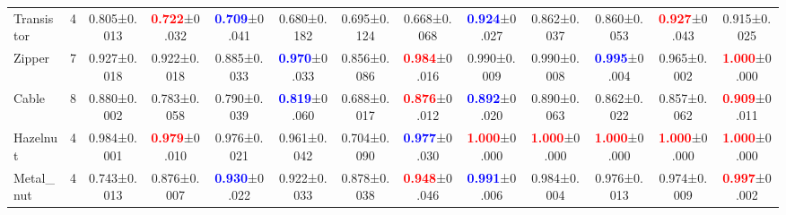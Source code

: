 \documentclass[10pt,twocolumn,letterpaper]{article}
\begin{document}
\begin{table*}[bt]
{\begin{tabular}{l@{}|c ||c||ccccc||ccccc}
    Transistor & 4& 0.805\footnotesize{±0.013}& \textcolor{red}{\textbf{0.722}}\footnotesize{±0.032}& \textcolor{blue}{\textbf{0.709}}\footnotesize{±0.041}& 0.680\footnotesize{±0.182}& 0.695\footnotesize{±0.124}& 0.668\footnotesize{±0.068}& \textcolor{blue}{\textbf{0.924}}\footnotesize{±0.027}& 0.862\footnotesize{±0.037}& 0.860\footnotesize{±0.053}& \textcolor{red}{\textbf{0.927}}\footnotesize{±0.043}& 0.915\footnotesize{±0.025} \\
    
    Zipper & 7& 0.927\footnotesize{±0.018}& 0.922\footnotesize{±0.018}& 0.885\footnotesize{±0.033}& \textcolor{blue}{\textbf{0.970}}\footnotesize{±0.033}& 0.856\footnotesize{±0.086}& \textcolor{red}{\textbf{0.984}}\footnotesize{±0.016}& 0.990\footnotesize{±0.009}& 0.990\footnotesize{±0.008}& \textcolor{blue}{\textbf{0.995}}\footnotesize{±0.004}& 0.965\footnotesize{±0.002}& \textcolor{red}{\textbf{1.000}}\footnotesize{±0.000} \\
    
    Cable &8& 0.880\footnotesize{±0.002}& 0.783\footnotesize{±0.058}& 0.790\footnotesize{±0.039}& \textcolor{blue}{\textbf{0.819}}\footnotesize{±0.060}& 0.688\footnotesize{±0.017}& \textcolor{red}{\textbf{0.876}}\footnotesize{±0.012}& \textcolor{blue}{\textbf{0.892}}\footnotesize{±0.020}& 0.890\footnotesize{±0.063}& 0.862\footnotesize{±0.022}& 0.857\footnotesize{±0.062}& \textcolor{red}{\textbf{0.909}}\footnotesize{±0.011} \\
    
    Hazelnut &4& 0.984\footnotesize{±0.001}& \textcolor{red}{\textbf{0.979}}\footnotesize{±0.010}& 0.976\footnotesize{±0.021}& 0.961\footnotesize{±0.042}& 0.704\footnotesize{±0.090}& \textcolor{blue}{\textbf{0.977}}\footnotesize{±0.030}& \textcolor{red}{\textbf{1.000}}\footnotesize{±0.000}& \textcolor{red}{\textbf{1.000}}\footnotesize{±0.000}& \textcolor{red}{\textbf{1.000}}\footnotesize{±0.000}& \textcolor{red}{\textbf{1.000}}\footnotesize{±0.000}& \textcolor{red}{\textbf{1.000}}\footnotesize{±0.000} \\
    
    Metal\_nut & 4 & 0.743\footnotesize{±0.013}& 0.876\footnotesize{±0.007}& \textcolor{blue}{\textbf{0.930}}\footnotesize{±0.022}& 0.922\footnotesize{±0.033}& 0.878\footnotesize{±0.038}& \textcolor{red}{\textbf{0.948}}\footnotesize{±0.046}& \textcolor{blue}{\textbf{0.991}}\footnotesize{±0.006}& 0.984\footnotesize{±0.004}& 0.976\footnotesize{±0.013}& 0.974\footnotesize{±0.009}& \textcolor{red}{\textbf{0.997}}\footnotesize{±0.002} \\
    

\end{tabular}}
\end{table*}
\end{document}
